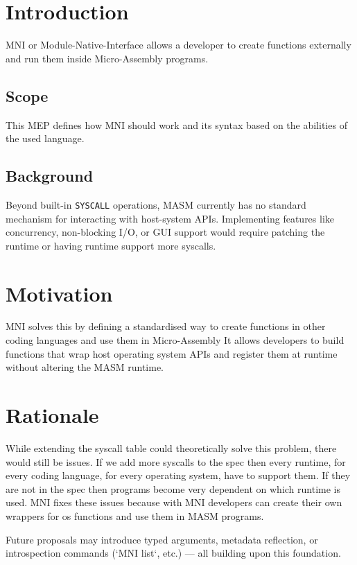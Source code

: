 \documentclass[11pt]{article}
\begin{document}
	\tableofcontents
	\newpage
	
	\section{Introduction}
	MNI or Module-Native-Interface allows a developer to create functions externally and run them inside Micro-Assembly programs.
	
	\subsection{Scope}
	This MEP defines how MNI should work and its syntax based on the abilities of the used language.
	
	\subsection{Background}
	Beyond built-in {\tt SYSCALL} operations, MASM currently has no standard mechanism for interacting with host-system APIs.  
	Implementing features like concurrency, non-blocking I/O, or GUI support would require patching the runtime or having runtime support more syscalls.
	
	\section{Motivation}
	MNI solves this by defining a standardised way to create functions in other coding languages and use them in Micro-Assembly
	It allows developers to build functions that wrap host operating system APIs and register them at runtime without altering the MASM runtime.
	
	\section{Rationale}
	While extending the syscall table could theoretically solve this problem, there would still be issues. If we add more syscalls to the spec then every runtime, for every coding language, for every operating system, have to support them. If they are not in the spec then programs become very dependent on which runtime is used.
	MNI fixes these issues because with MNI developers can create their own wrappers for os functions and use them in MASM programs.
	
	Future proposals may introduce typed arguments, metadata reflection, or introspection commands (`MNI list`, etc.) — all building upon this foundation.
\end{document}
